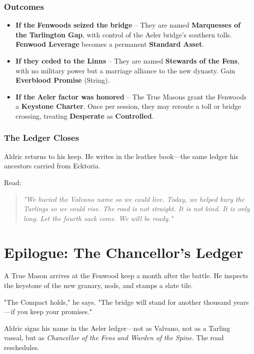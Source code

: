 \documentclass[11pt]{book}
\begin{document}
\subsection*{Outcomes}
\begin{itemize}
    \item \textbf{If the Fenwoods seized the bridge} -- They are named \textbf{Marquesses of the Tarlington Gap}, with control of the Aeler bridge's southern tolls. \textbf{Fenwood Leverage} becomes a permanent \textbf{Standard Asset}.
    \item \textbf{If they ceded to the Linns} -- They are named \textbf{Stewards of the Fens}, with no military power but a marriage alliance to the new dynasty. Gain \textbf{Everblood Promise} (String).
    \item \textbf{If the Aeler factor was honored} -- The True Masons grant the Fenwoods a \textbf{Keystone Charter}. Once per session, they may reroute a toll or bridge crossing, treating \textbf{Desperate} as \textbf{Controlled}.
\end{itemize}

\subsection*{The Ledger Closes}
Aldric returns to his keep. He writes in the leather book---the same ledger his ancestors carried from Ecktoria.

Read:
\begin{quote}
\emph{"We buried the Valvano name so we could live. Today, we helped bury the Tarlings so we could rise. The road is not straight. It is not kind. It is only long.}
\emph{Let the fourth sack come. We will be ready."}
\end{quote}

\clearpage

\chapter*{Epilogue: The Chancellor's Ledger}

\lettrine{A}{} True Mason arrives at the Fenwood keep a month after the battle. He inspects the keystone of the new granary, nods, and stamps a slate tile.

"The Compact holds," he says. "The bridge will stand for another thousand years---if you keep your promises."

Aldric signs his name in the Aeler ledger---not as Valvano, not as a Tarling vassal, but as \textit{Chancellor of the Fens and Warden of the Spine}. The road reschedules.
\end{document}
